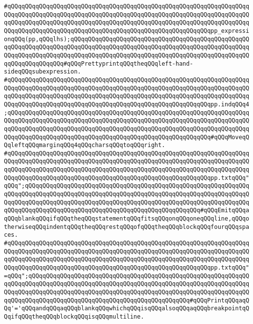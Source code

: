 \verb|#qQQqqQQqqQQqqQQqqQQqqQQqqQQqqQQqqQQqqQQqqQQqqQQqqQQqqQQqqQQqqQQqqQQqqQQqqQQqqQQqqQQqqQQqqQQqqQQqqQQqqQQqqQQqqQQqqQQqqQQqqQQqqQQqqQQqqQQqqQQqqQQqqQQqqQQqqQQqqQQqqQQqqQQqqQQqqQQqqQQqqQQqqQQqqQQqqQQqqQQqqQQqqQQqqQQqqQQqqQQqqQQqqQQqqQQqqQQqqQQqqQQqqQQqqQQqqQQqqQQqqQQqqQQqpp_expressionqQQq(pp,qQQqlhs);qQQqqQQqqQQqqQQqqQQqqQQqqQQqqQQqqQQqqQQqqQQqqQQqqQQqqQQqqQQqqQQqqQQqqQQqqQQqqQQqqQQqqQQqqQQqqQQqqQQqqQQqqQQqqQQqqQQqqQQqqQQqqQQqqQQqqQQqqQQqqQQqqQQqqQQqqQQqqQQqqQQqqQQqqQQqqQQqqQQqqQQqqQQqqQQqqQQqqQQqqQQqqQQq#qQQqPrettyprintqQQqtheqQQqleft-hand-sideqQQqsubexpression.|\newline
\verb|#qQQqqQQqqQQqqQQqqQQqqQQqqQQqqQQqqQQqqQQqqQQqqQQqqQQqqQQqqQQqqQQqqQQqqQQqqQQqqQQqqQQqqQQqqQQqqQQqqQQqqQQqqQQqqQQqqQQqqQQqqQQqqQQqqQQqqQQqqQQqqQQqqQQqqQQqqQQqqQQqqQQqqQQqqQQqqQQqqQQqqQQqqQQqqQQqqQQqqQQqqQQqqQQqqQQqqQQqqQQqqQQqqQQqqQQqqQQqqQQqqQQqqQQqqQQqqQQqqQQqqQQqqQQqpp.indqQQq4;qQQqqQQqqQQqqQQqqQQqqQQqqQQqqQQqqQQqqQQqqQQqqQQqqQQqqQQqqQQqqQQqqQQqqQQqqQQqqQQqqQQqqQQqqQQqqQQqqQQqqQQqqQQqqQQqqQQqqQQqqQQqqQQqqQQqqQQqqQQqqQQqqQQqqQQqqQQqqQQqqQQqqQQqqQQqqQQqqQQqqQQqqQQqqQQqqQQqqQQqqQQqqQQqqQQqqQQqqQQqqQQqqQQqqQQqqQQqqQQqqQQqqQQqqQQqqQQqqQQqqQQqqQQq#qQQqMoveqQQqleftqQQqmarginqQQq4qQQqcharsqQQqtoqQQqright.|\newline
\verb|#qQQqqQQqqQQqqQQqqQQqqQQqqQQqqQQqqQQqqQQqqQQqqQQqqQQqqQQqqQQqqQQqqQQqqQQqqQQqqQQqqQQqqQQqqQQqqQQqqQQqqQQqqQQqqQQqqQQqqQQqqQQqqQQqqQQqqQQqqQQqqQQqqQQqqQQqqQQqqQQqqQQqqQQqqQQqqQQqqQQqqQQqqQQqqQQqqQQqqQQqqQQqqQQqqQQqqQQqqQQqqQQqqQQqqQQqqQQqqQQqqQQqqQQqqQQqqQQqqQQqqQQqqQQqpp.txtqQQq"qQQq";qQQqqQQqqQQqqQQqqQQqqQQqqQQqqQQqqQQqqQQqqQQqqQQqqQQqqQQqqQQqqQQqqQQqqQQqqQQqqQQqqQQqqQQqqQQqqQQqqQQqqQQqqQQqqQQqqQQqqQQqqQQqqQQqqQQqqQQqqQQqqQQqqQQqqQQqqQQqqQQqqQQqqQQqqQQqqQQqqQQqqQQqqQQqqQQqqQQqqQQqqQQqqQQqqQQqqQQqqQQqqQQqqQQqqQQqqQQqqQQqqQQqqQQqqQQqqQQqqQQq#qQQqEmitqQQqaqQQqblankqQQqifqQQqtheqQQqstatementqQQqfitsqQQqonqQQqoneqQQqline,qQQqotherwiseqQQqindentqQQqtheqQQqrestqQQqofqQQqtheqQQqblockqQQqfourqQQqspaces.|\newline
\verb|#qQQqqQQqqQQqqQQqqQQqqQQqqQQqqQQqqQQqqQQqqQQqqQQqqQQqqQQqqQQqqQQqqQQqqQQqqQQqqQQqqQQqqQQqqQQqqQQqqQQqqQQqqQQqqQQqqQQqqQQqqQQqqQQqqQQqqQQqqQQqqQQqqQQqqQQqqQQqqQQqqQQqqQQqqQQqqQQqqQQqqQQqqQQqqQQqqQQqqQQqqQQqqQQqqQQqqQQqqQQqqQQqqQQqqQQqqQQqqQQqqQQqqQQqqQQqqQQqqQQqqQQqqQQqpp.txtqQQq"=qQQq";qQQqqQQqqQQqqQQqqQQqqQQqqQQqqQQqqQQqqQQqqQQqqQQqqQQqqQQqqQQqqQQqqQQqqQQqqQQqqQQqqQQqqQQqqQQqqQQqqQQqqQQqqQQqqQQqqQQqqQQqqQQqqQQqqQQqqQQqqQQqqQQqqQQqqQQqqQQqqQQqqQQqqQQqqQQqqQQqqQQqqQQqqQQqqQQqqQQqqQQqqQQqqQQqqQQqqQQqqQQqqQQqqQQqqQQqqQQqqQQqqQQqqQQqqQQqqQQq#qQQqPrintqQQqaqQQq'='qQQqandqQQqaqQQqblankqQQqwhichqQQqisqQQqalsoqQQqaqQQqbreakpointqQQqifqQQqtheqQQqblockqQQqisqQQqmultiline.|\newline
